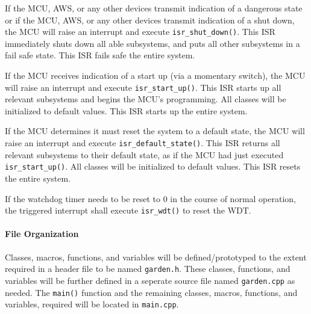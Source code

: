 If the MCU, AWS, or any other devices transmit indication of a dangerous
state or if the MCU, AWS, or any other devices transmit indication of a
shut down, the MCU will raise an interrupt and execute
\texttt{isr\_shut\_down()}. This ISR immediately shuts down all able
subsystems, and puts all other subsystems in a fail safe state. This ISR
fails safe the entire system.

If the MCU receives indication of a start up (via a momentary switch), the
MCU will raise an interrupt and execute \texttt{isr\_start\_up()}. This ISR
starts up all relevant subsystems and begins the MCU's programming. All
classes will be initialized to default values. This ISR starts up the
entire system.

If the MCU determines it must reset the system to a default state, the
MCU will raise an interrupt and execute \texttt{isr\_default\_state()}.
This ISR returns all relevant subsystems to their default state,
as if the MCU had just executed \texttt{isr\_start\_up()}. All classes will
be initialized to default values. This ISR resets the entire system.

If the watchdog timer needs to be reset to 0 in the course of normal operation, the triggered interrupt shall execute \texttt{isr\_wdt()} to reset the WDT.

\paragraph{File Organization}
Classes, macros, functions, and variables will be defined/prototyped to the
extent required in a header file to be named \texttt{garden.h}. These
classes, functions, and variables will be further defined in a seperate
source file named \texttt{garden.cpp} as needed. The \texttt{main()}
function and the remaining classes, macros, functions, and variables,
required will be located in \texttt{main.cpp}.

